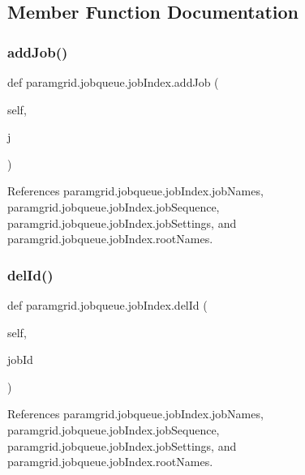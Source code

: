 \subsection{Member Function Documentation}
\mbox{\label{classparamgrid_1_1jobqueue_1_1jobIndex_a74a0c4dce1318108c3017334fdf399ee}} 
\subsubsection{\texorpdfstring{add\+Job()}{addJob()}}
{\footnotesize\ttfamily def paramgrid.\+jobqueue.\+job\+Index.\+add\+Job (\begin{DoxyParamCaption}\item[{}]{self,  }\item[{}]{j }\end{DoxyParamCaption})}



References paramgrid.\+jobqueue.\+job\+Index.\+job\+Names, paramgrid.\+jobqueue.\+job\+Index.\+job\+Sequence, paramgrid.\+jobqueue.\+job\+Index.\+job\+Settings, and paramgrid.\+jobqueue.\+job\+Index.\+root\+Names.

\mbox{\label{classparamgrid_1_1jobqueue_1_1jobIndex_aee54c89b7dd7a7048f938c29c045beee}} 
\subsubsection{\texorpdfstring{del\+Id()}{delId()}}
{\footnotesize\ttfamily def paramgrid.\+jobqueue.\+job\+Index.\+del\+Id (\begin{DoxyParamCaption}\item[{}]{self,  }\item[{}]{job\+Id }\end{DoxyParamCaption})}



References paramgrid.\+jobqueue.\+job\+Index.\+job\+Names, paramgrid.\+jobqueue.\+job\+Index.\+job\+Sequence, paramgrid.\+jobqueue.\+job\+Index.\+job\+Settings, and paramgrid.\+jobqueue.\+job\+Index.\+root\+Names.



